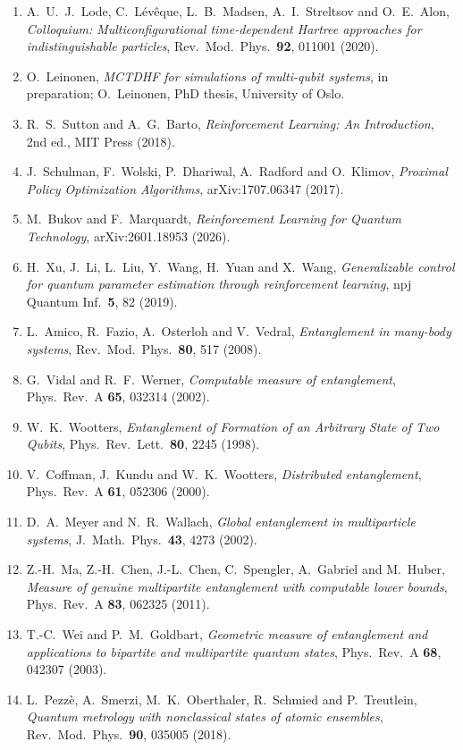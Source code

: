 \documentclass[12pt,a4paper]{article}
\begin{document}
\begin{enumerate}
    \item A.~U.~J.~Lode, C.~L\'ev\^eque, L.~B.~Madsen, A.~I.~Streltsov and O.~E.~Alon, \textit{Colloquium: Multiconfigurational time-dependent Hartree approaches for indistinguishable particles}, Rev.\ Mod.\ Phys.\ \textbf{92}, 011001 (2020).
    \item O.~Leinonen, \textit{MCTDHF for simulations of multi-qubit systems}, in preparation; O.~Leinonen, PhD thesis, University of Oslo.
    \item R.~S.~Sutton and A.~G.~Barto, \textit{Reinforcement Learning: An Introduction}, 2nd ed., MIT Press (2018).
    \item J.~Schulman, F.~Wolski, P.~Dhariwal, A.~Radford and O.~Klimov, \textit{Proximal Policy Optimization Algorithms}, arXiv:1707.06347 (2017).
    \item M.~Bukov and F.~Marquardt, \textit{Reinforcement Learning for Quantum Technology}, arXiv:2601.18953 (2026).
    \item H.~Xu, J.~Li, L.~Liu, Y.~Wang, H.~Yuan and X.~Wang, \textit{Generalizable control for quantum parameter estimation through reinforcement learning}, npj Quantum Inf.\ \textbf{5}, 82 (2019).
    \item L.~Amico, R.~Fazio, A.~Osterloh and V.~Vedral, \textit{Entanglement in many-body systems}, Rev.\ Mod.\ Phys.\ \textbf{80}, 517 (2008).
    \item G.~Vidal and R.~F.~Werner, \textit{Computable measure of entanglement}, Phys.\ Rev.\ A \textbf{65}, 032314 (2002).
    \item W.~K.~Wootters, \textit{Entanglement of Formation of an Arbitrary State of Two Qubits}, Phys.\ Rev.\ Lett.\ \textbf{80}, 2245 (1998).
    \item V.~Coffman, J.~Kundu and W.~K.~Wootters, \textit{Distributed entanglement}, Phys.\ Rev.\ A \textbf{61}, 052306 (2000).
    \item D.~A.~Meyer and N.~R.~Wallach, \textit{Global entanglement in multiparticle systems}, J.\ Math.\ Phys.\ \textbf{43}, 4273 (2002).
    \item Z.-H.~Ma, Z.-H.~Chen, J.-L.~Chen, C.~Spengler, A.~Gabriel and M.~Huber, \textit{Measure of genuine multipartite entanglement with computable lower bounds}, Phys.\ Rev.\ A \textbf{83}, 062325 (2011).
    \item T.-C.~Wei and P.~M.~Goldbart, \textit{Geometric measure of entanglement and applications to bipartite and multipartite quantum states}, Phys.\ Rev.\ A \textbf{68}, 042307 (2003).
    \item L.~Pezz\`e, A.~Smerzi, M.~K.~Oberthaler, R.~Schmied and P.~Treutlein, \textit{Quantum metrology with nonclassical states of atomic ensembles}, Rev.\ Mod.\ Phys.\ \textbf{90}, 035005 (2018).

\end{enumerate}
\end{document}
